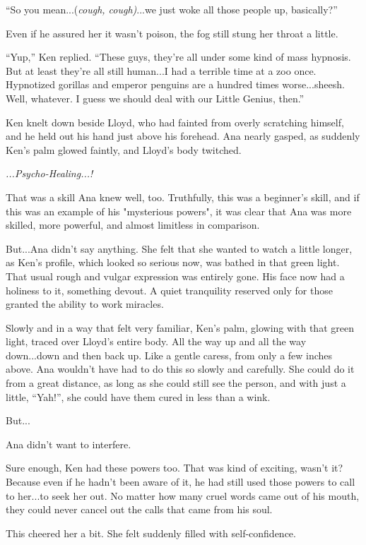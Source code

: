 \documentclass[
]{article}
\begin{document}
``So you mean...(\emph{cough, cough)}...we just woke all those people
up, basically?''

Even if he assured her it wasn't poison, the fog still stung her throat
a little.

``Yup,'' Ken replied. ``These guys, they're all under some kind of mass
hypnosis. But at least they're all still human...I had a terrible time
at a zoo once. Hypnotized gorillas and emperor penguins are a hundred
times worse...sheesh. Well, whatever. I guess we should deal with our
Little Genius, then.''

Ken knelt down beside Lloyd, who had fainted from overly scratching
himself, and he held out his hand just above his forehead. Ana nearly
gasped, as suddenly Ken's palm glowed faintly, and Lloyd's body
twitched.

\emph{...Psycho-Healing...!}

That was a skill Ana knew well, too. Truthfully, this was a beginner's
skill, and if this was an example of his "mysterious powers", it was
clear that Ana was more skilled, more powerful, and almost limitless in
comparison.

But...Ana didn't say anything. She felt that she wanted to watch a
little longer, as Ken's profile, which looked so serious now, was bathed
in that green light. That usual rough and vulgar expression was entirely
gone. His face now had a holiness to it, something devout. A quiet
tranquility reserved only for those granted the ability to work
miracles.

Slowly and in a way that felt very familiar, Ken's palm, glowing with
that green light, traced over Lloyd's entire body. All the way up and
all the way down...down and then back up. Like a gentle caress, from
only a few inches above. Ana wouldn't have had to do this so slowly and
carefully. She could do it from a great distance, as long as she could
still see the person, and with just a little, ``Yah!'', she could have
them cured in less than a wink.

But...

Ana didn't want to interfere.

Sure enough, Ken had these powers too. That was kind of exciting, wasn't
it? Because even if he hadn't been aware of it, he had still used those
powers to call to her...to seek her out. No matter how many cruel words
came out of his mouth, they could never cancel out the calls that came
from his soul.

This cheered her a bit. She felt suddenly filled with self-confidence.
\end{document}
